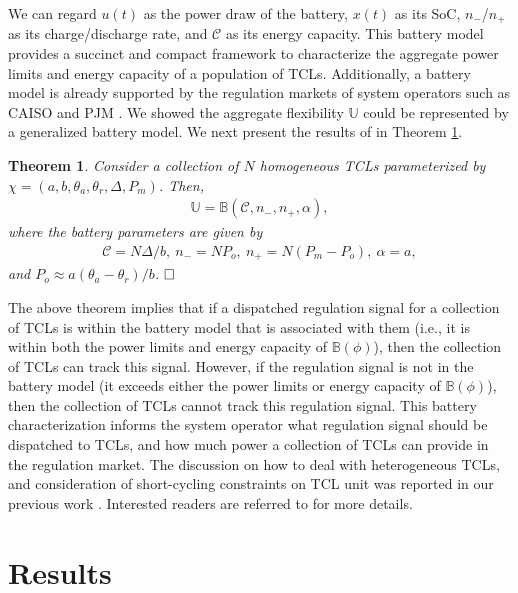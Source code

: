 \documentclass[onecolumn,journal]{IEEEtran}
\newtheorem{theorem}{Theorem}
\begin{document}
We can regard $u(t)$ as the power draw of the battery, $x(t)$ as its SoC, $n_-$/$n_+$ as its charge/discharge rate, and $\mathcal{C}$ as its energy capacity. This battery model provides a succinct and compact framework to characterize the aggregate power limits and energy capacity of a population of \acp{TCL}.  Additionally, a battery model is already supported by the regulation markets of system operators such as \ac{CAISO} and \ac{PJM} \cite{CAISO_storage, PJM_storage}. We showed the aggregate flexibility $\mathbb{U}$ could be represented by a generalized battery model. We next present the results of \cite{hehao2013generalized, HH_BS_KP_TV_TPS_2013} in Theorem \ref{thm:main_results}.

\begin{theorem}\label{thm:main_results}
Consider a collection of $N$ \emph{homogeneous} \acp{TCL} parameterized by $\chi = (a,b, \theta_a, \theta_r, \Delta, P_m)$.  Then, 
\begin{align}
 \mathbb{U} = \mathbb{B}( \mathcal{C}, n_-,n_+, \alpha), 
\end{align} 
where the battery parameters are given by
\begin{align*}
\mathcal{C}=N\Delta/b, \ n_-= N P_{o}, \ n_+=N (P_{m}-P_{o}), \ \alpha =a,
\end{align*}
and $P_{o} \approx a(\theta_{a}-\theta_{r})/b$. $\hfill \Box$
\end{theorem}

The above theorem implies that if a dispatched regulation signal for a collection of \acp{TCL} is within the  battery model that is associated with them (i.e., it is within both the power limits and energy capacity of $\mathbb{B}(\phi)$), then the collection of \acp{TCL} can track this signal. However, if the regulation signal is not in the battery model (it exceeds either the power limits or energy capacity of $\mathbb{B}(\phi)$), then the collection of TCLs cannot track this regulation signal. This battery characterization informs the system operator what regulation signal should be dispatched to \acp{TCL}, and how much power a collection of \acp{TCL} can provide in the regulation market.  The discussion on how to deal with heterogeneous \acp{TCL}, and consideration of short-cycling constraints on \ac{TCL} unit was reported in our previous work \cite{BS_HH_KP_TV_ACC:2013}. Interested readers are referred to \cite{BS_HH_KP_TV_ACC:2013} for more details.



\section{Results}
\label{sec:potential}
\end{document}

